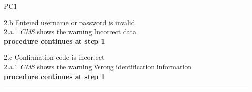 \begin{lyxlist}{PC1}
{2.b Entered username or password is invalid\\
\hspace*{0.5cm} 2.a.1 \emph{CMS} shows the warning Incorrect data\\
\hspace*{0.5cm} \textbf{procedure continues at step 1}

2.c Confirmation code is incorrect\\
\hspace*{0.5cm} 2.a.1 \emph{CMS} shows the warning Wrong identification information\\
\hspace*{0.5cm} \textbf{procedure continues at step 1}

}
\end{lyxlist}
\hrule
\vspace{0.5cm}


